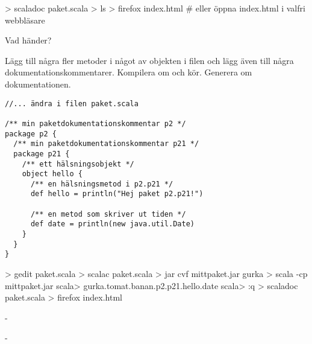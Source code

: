 \begin{REPL}
> scaladoc paket.scala
> ls
> firefox index.html   # eller öppna index.html i valfri webbläsare
\end{REPL}

Vad händer?

\Subtask Lägg till några fler metoder i något av objekten i filen  och lägg även till några dokumentationskommentarer. Kompilera om och kör. Generera om dokumentationen.

\begin{verbatim}
//... ändra i filen paket.scala

/** min paketdokumentationskommentar p2 */
package p2 {
  /** min paketdokumentationskommentar p21 */
  package p21 {
    /** ett hälsningsobjekt */
    object hello {
      /** en hälsningsmetod i p2.p21 */
      def hello = println("Hej paket p2.p21!")

      /** en metod som skriver ut tiden */
      def date = println(new java.util.Date)
    }
  }
}

\end{verbatim}

\begin{REPL}
> gedit paket.scala
> scalac paket.scala
> jar cvf mittpaket.jar gurka
> scala -cp mittpaket.jar
scala> gurka.tomat.banan.p2.p21.hello.date
scala> :q
> scaladoc paket.scala
> firefox index.html
\end{REPL}

\SOLUTION


\TaskSolved \what

\SubtaskSolved  -

\SubtaskSolved  -

\QUESTEND




\QUESTBEGIN

\Task \what~\TODO

\SOLUTION

\TaskSolved \what~\TODO

\QUESTEND
